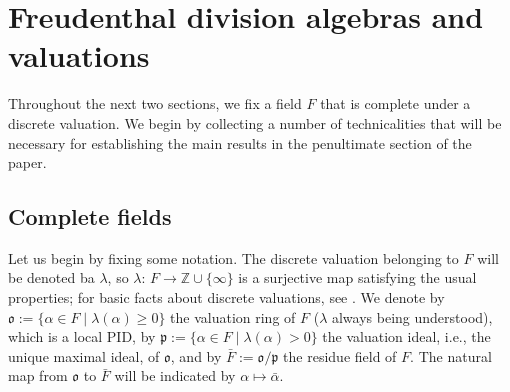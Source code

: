 \documentclass{amsart}
\theoremstyle{definition} %
\theoremstyle{remark} %
\newcommand{\ZZ}{\mathbb{Z}}
\newcommand{\IZ}{\ZZ}
\newcommand{\mfo}{\mathfrak{o}}
\newcommand{\mfp}{\mathfrak{p}}
\renewcommand{\:}{\colon\,}
\numberwithin{equation}{section}
\begin{document}
	

\section{Freudenthal division algebras and valuations} \label{s.FREDIVA} Throughout the next two sections, we fix a field $F$ that is complete under a discrete valuation. We begin by  collecting a number of technicalities that will be necessary for establishing the main results in the penultimate section of the paper. 

\subsection{Complete fields} \label{ss.COMFIE} Let us begin by fixing some notation. The discrete valuation belonging to $F$ will be denoted ba $\lambda$, so $\lambda\:F\to \IZ \cup \{\infty\}$ is a surjective map satisfying the usual properties; for basic facts about discrete valuations, see \cite{MR2215492}. We denote by $\mfo := \{\alpha \in F \mid \lambda(\alpha) \ge 0\}$ the valuation ring of $F$ ($\lambda$ always being understood), which is a local PID, by $\mfp := \{\alpha \in F \mid \lambda(\alpha) > 0\}$ the valuation ideal, i.e., the unique maximal ideal, of $\mfo$, and by $\bar F := \mfo/\mfp$ the residue field of $F$. The natural map from $\mfo$ to $\bar F$ will be indicated by $\alpha \mapsto \bar\alpha$.
\end{document}
